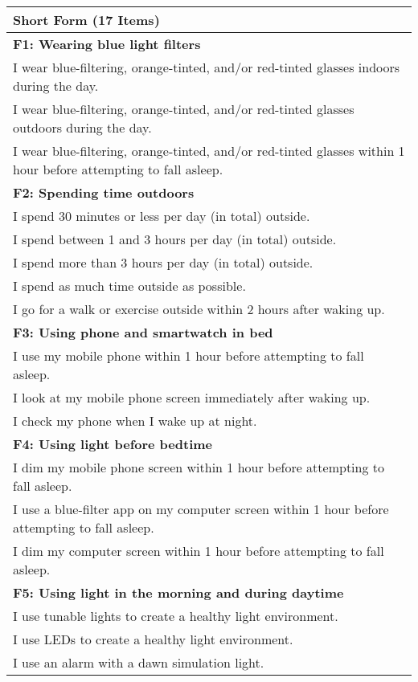 \begin{appendix}
\newpage

\begin{longtable}[]{@{}
  >{\raggedright\arraybackslash}p{}@{}}
\toprule
Short Form (17 Items) \\
\midrule
\endhead
\textbf{F1: Wearing blue light filters} \\
I wear blue-filtering, orange-tinted, and/or red-tinted glasses indoors
during the day. \\
I wear blue-filtering, orange-tinted, and/or red-tinted glasses outdoors
during the day. \\
I wear blue-filtering, orange-tinted, and/or red-tinted glasses within 1
hour before attempting to fall asleep. \\
\textbf{F2: Spending time outdoors} \\
I spend 30 minutes or less per day (in total) outside. \\
I spend between 1 and 3 hours per day (in total) outside. \\
I spend more than 3 hours per day (in total) outside. \\
I spend as much time outside as possible. \\
I go for a walk or exercise outside within 2 hours after waking up. \\
\textbf{F3: Using phone and smartwatch in bed} \\
I use my mobile phone within 1 hour before attempting to fall asleep. \\
I look at my mobile phone screen immediately after waking up. \\
I check my phone when I wake up at night. \\
\textbf{F4: Using light before bedtime} \\
I dim my mobile phone screen within 1 hour before attempting to fall
asleep. \\
I use a blue-filter app on my computer screen within 1 hour before
attempting to fall asleep. \\
I dim my computer screen within 1 hour before attempting to fall
asleep. \\
\textbf{F5: Using light in the morning and during daytime} \\
I use tunable lights to create a healthy light environment. \\
I use LEDs to create a healthy light environment. \\
I use an alarm with a dawn simulation light. \\
\bottomrule
\end{longtable}
\end{appendix}
